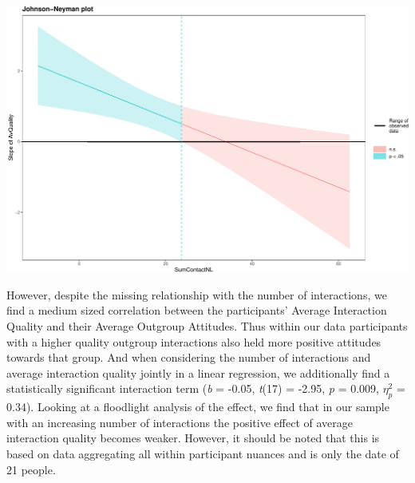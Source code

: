 \includegraphics{Figures/workerModelOlsAttFreqQual-2.pdf}

However, despite the missing relationship with the number of
interactions, we find a medium sized correlation between the
participants' Average Interaction Quality and their Average Outgroup
Attitudes. Thus within our data participants with a higher quality
outgroup interactions also held more positive attitudes towards that
group. And when considering the number of interactions and average
interaction quality jointly in a linear regression, we additionally find
a statistically significant interaction term (\textit{b} = -0.05,
\textit{t}(17) = -2.95, \textit{p} = 0.009, \(\eta_p^2\) = 0.34).
Looking at a floodlight analysis of the effect, we find that in our
sample with an increasing number of interactions the positive effect of
average interaction quality becomes weaker. However, it should be noted
that this is based on data aggregating all within participant nuances
and is only the date of 21 people.

